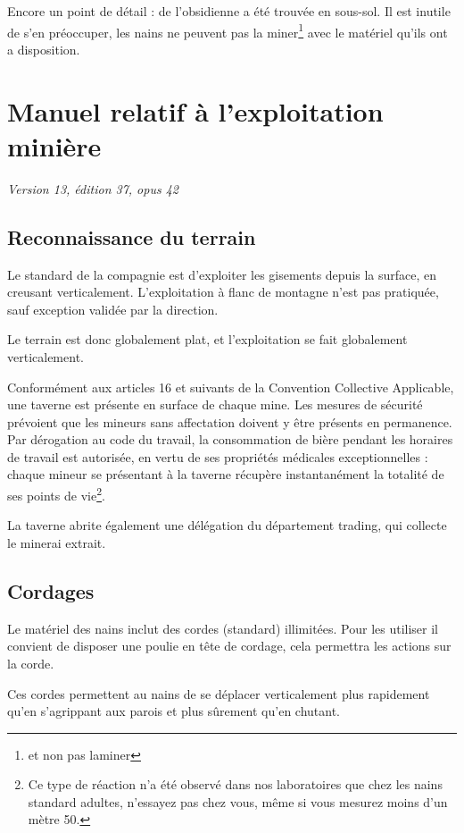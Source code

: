   Encore un point de détail : de l'obsidienne a été trouvée en sous-sol. Il est
  inutile de s'en préoccuper, les nains ne peuvent pas la miner\footnote{et non
  pas laminer} avec le matériel qu'ils ont a disposition.

\newpage

\section{Manuel relatif à l'exploitation minière}

  \textit{Version 13, édition 37, opus 42}

\subsection{Reconnaissance du terrain}

  Le standard de la compagnie est d'exploiter les gisements depuis la surface,
  en creusant verticalement. L'exploitation à flanc de montagne n'est pas
  pratiquée, sauf exception validée par la direction.

  Le terrain est donc globalement plat, et l'exploitation se fait globalement
  verticalement.

  Conformément aux articles 16 et suivants de la Convention Collective
  Applicable, une taverne est présente en surface de chaque mine. Les mesures
  de sécurité prévoient que les mineurs sans affectation doivent y être
  présents en permanence. Par dérogation au code du travail, la consommation de
  bière pendant les horaires de travail est autorisée, en vertu de ses
  propriétés médicales exceptionnelles : chaque mineur se présentant à la
  taverne récupère instantanément la totalité de ses points de vie\footnote{Ce
  type de réaction n'a été observé dans nos laboratoires que chez les nains
  standard adultes, n'essayez pas chez vous, même si vous mesurez moins d'un
  mètre 50.}.

  La taverne abrite également une délégation du département trading, qui
  collecte le minerai extrait.

\subsection{Cordages}

  Le matériel des nains inclut des cordes (standard) illimitées. Pour les
  utiliser il convient de disposer une poulie en tête de cordage, cela
  permettra les actions sur la corde.

  Ces cordes permettent au nains de se déplacer verticalement plus rapidement
  qu'en s'agrippant aux parois et plus sûrement qu'en chutant.

